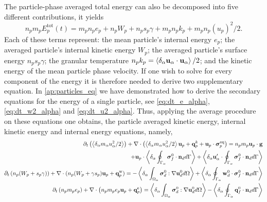 The particle-phase averaged total energy can also be decomposed into five different contributions, it yields 
\begin{equation*}
    n_p m_p E_p^\text{tot}(t) 
    = m_p n_p e_p 
    + n_p W_p
    + n_p s_p \gamma
    + m_p n_p k_p
    + m_p n_p (u_p)^2/2. 
    \label{eq:E_p_def}
\end{equation*}
Each of these terms represent: 
the mean particle's internal energy $e_p$; 
the averaged particle's internal kinetic energy $W_p$;
the averaged particle's surface energy $n_p s_p \gamma$;
the granular temperature $n_p k_p =\left<\delta_\alpha \textbf{u}_\alpha \cdot\textbf{u}_\alpha\right>/2$;
and the kinetic energy of the mean particle phase velocity. 
If one wish to solve for every component of the energy it is therefore needed to derive two supplementary equation. 
In \ref{ap:particles_eq} we have demonstrated how to derive the secondary equations for the energy of a single particle, see  \ref{eq:dt_e_alpha}, \ref{eq:dt_w2_alpha} and \ref{eq:dt_u2_alpha}. 
Thus, applying the average procedure on these equations one obtains, the particle averaged kinetic energy, internal kinetic energy and internal energy equations, namely,
\begin{align}
    \label{eq:dt_hybrid_u2p}
    \partial_t \left(\left<\delta_\alpha m_\alpha u_\alpha^2/2\right>\right)
    + \mathbf{\nabla}\cdot \left(\left<\delta_\alpha m_\alpha u_\alpha^2/2\right> \textbf{u}_p 
    + \textbf{q}^k_p
    + \textbf{u}_p \cdot \bm{\sigma}_p^\text{eq}
    \right)
    = 
    n_p m_p \textbf{u}_p \cdot
    \textbf{g}\nonumber\\
    + \textbf{u}_p\cdot\left<\delta_\alpha \oint_{\Gamma_{\alpha}} {\bm{\sigma}_f^0 \cdot \textbf{n}_d} d\Gamma\right>
    + \left<\delta_\alpha \textbf{u}_\alpha'\cdot\oint_{\Gamma_{\alpha}} \bm{\sigma}_f^0 \cdot \textbf{n}_d d\Gamma\right>
    \\
    \label{eq:dt_hybrid_Wp}
    \partial_t \left(n_p (W_p + s_p\gamma)\right)
    + \mathbf{\nabla}\cdot 
    (n_p (W_p + \gamma s_p)
    \textbf{u}_p 
    +  \textbf{q}_p^\text{w}
    )
    = 
    - \left<\delta_\alpha \int_{\Omega_{\alpha}} {\bm{\sigma}_d^0 : \mathbf{\nabla}\textbf{u}_d^0} d\Omega\right>
    + \left<\delta_\alpha \oint_{\Gamma_{\alpha}} {\textbf{w}_d^0 \cdot \bm{\sigma}_f^0 \cdot  \textbf{n}_d} d\Gamma\right>
    \\
    \partial_t \left(n_p m_p e_p\right)
    + \mathbf{\nabla}\cdot \left(n_p
    m_p e_p \textbf{u}_p 
    +  \textbf{q}_p^\text{e}
    \right)
    = 
    \left<\delta_\alpha \int_{\Omega_{\alpha}} {\bm{\sigma}_d^0 : \mathbf{\nabla}\textbf{u}_d^0} d\Omega\right>
    - \left<\delta_\alpha \oint_{\Gamma_{\alpha}} {\textbf{q}_f^0\cdot \textbf{n}_d} d\Gamma\right>
    \label{eq:dt_hybrid_ep}
\end{align}
